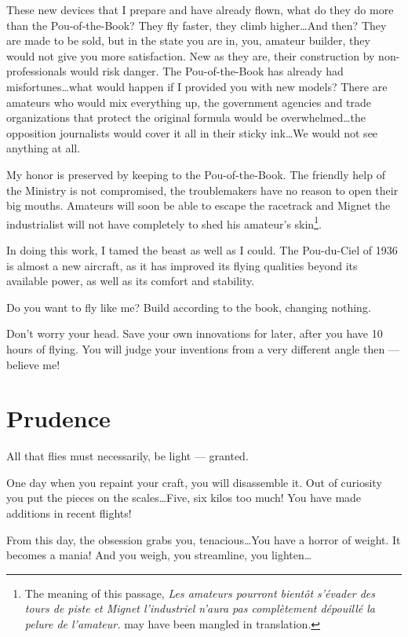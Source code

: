 \documentclass{book}
\begin{document}
These new devices that I prepare and have already flown, what do they
do more than the Pou-of-the-Book? They fly faster, they climb
higher\ldots And then? They are made to be sold, but in the state you
are in, you, amateur builder, they would not give you more
satisfaction. New as they are, their construction by non-professionals
would risk danger. The Pou-of-the-Book has already had
misfortunes\ldots what would happen if I provided you with new models?
There are amateurs who would mix everything up, the government
agencies and trade organizations that protect the original formula
would be overwhelmed\ldots the opposition journalists would cover it
all in their sticky ink\ldots We would not see anything at all.

My honor is preserved by keeping to the Pou-of-the-Book. The friendly
help of the Ministry is not compromised, the troublemakers have no
reason to open their big mouths. Amateurs will soon be able to escape
the racetrack and Mignet the industrialist will not have completely to
shed his amateur's skin\footnote{The meaning of this passage,
  \textit{\guillemotleft Les amateurs pourront bient\^ot s'\'evader
    des tours de piste et Mignet l'industriel n'aura pas
    compl\`etement d\'epouill\'e la pelure de
    l'amateur.\guillemotright} may have been mangled in translation.}.

In doing this work, I tamed the beast as well as I could. The
Pou-du-Ciel of 1936 is almost a new aircraft, as it has improved its
flying qualities beyond its available power, as well as its comfort
and stability.

Do you want to fly like me?  Build according to the book, changing
nothing.

Don't worry your head.  Save your own innovations for later, after you
have 10 hours of flying.  You will judge your inventions from a very
different angle then --- believe me!

\section{Prudence}

All that flies must necessarily, be light --- granted.

One day when you repaint your craft, you will disassemble it. Out of
curiosity you put the pieces on the scales\ldots Five, six kilos too
much! You have made additions in recent flights!

From this day, the obsession grabs you, tenacious\ldots You have a
horror of weight. It becomes a mania! And you weigh, you streamline,
you lighten\ldots
\end{document}
